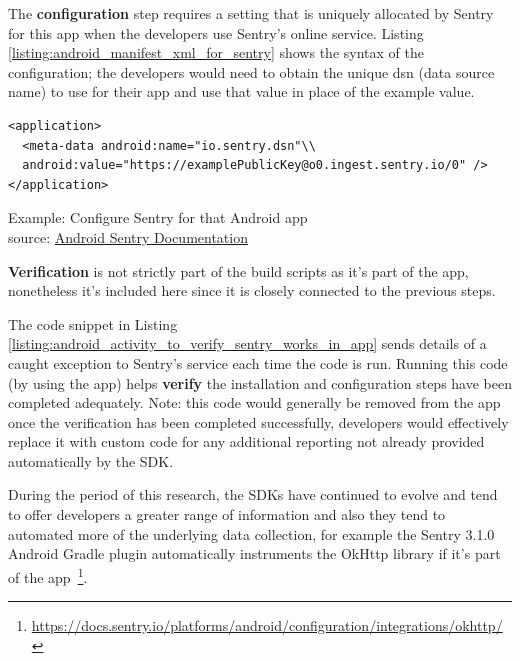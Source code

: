 The \textbf{configuration} step requires a setting that is uniquely allocated by Sentry for this app when the developers use Sentry's online service. Listing \ref{listing:android_manifest_xml_for_sentry} shows the syntax of the configuration; the developers would need to obtain the unique dsn (data source name) to use for their app and use that value in place of the example value.

\begin{listing}
\begin{verbatim}
<application>
  <meta-data android:name="io.sentry.dsn"\\
  android:value="https://examplePublicKey@o0.ingest.sentry.io/0" />
</application>
\end{verbatim}
\caption{Example: Configure Sentry for that Android app\\source: \href{https://docs.sentry.io/platforms/android/}{Android Sentry Documentation}}
\label{listing:android_manifest_xml_for_sentry}
\end{listing}

\textbf{Verification} is not strictly part of the build scripts as it's part of the app, nonetheless it's included here since it is closely connected to the previous steps.

The code snippet in Listing \ref{listing:android_activity_to_verify_sentry_works_in_app} sends details of a caught exception to Sentry's service each time the code is run. Running this code (by using the app) helps \textbf{verify} the installation and configuration steps have been completed adequately. Note: this code would generally be removed from the app once the verification has been completed successfully, developers would effectively replace it with custom code for any additional reporting not already provided automatically by the SDK. %

During the period of this research, the SDKs have continued to evolve and tend to offer developers a greater range of information and also they tend to automated more of the underlying data collection, for example the Sentry 3.1.0 Android Gradle plugin automatically instruments the OkHttp library if it's part of the app~\footnote{\url{https://docs.sentry.io/platforms/android/configuration/integrations/okhttp/}}.


